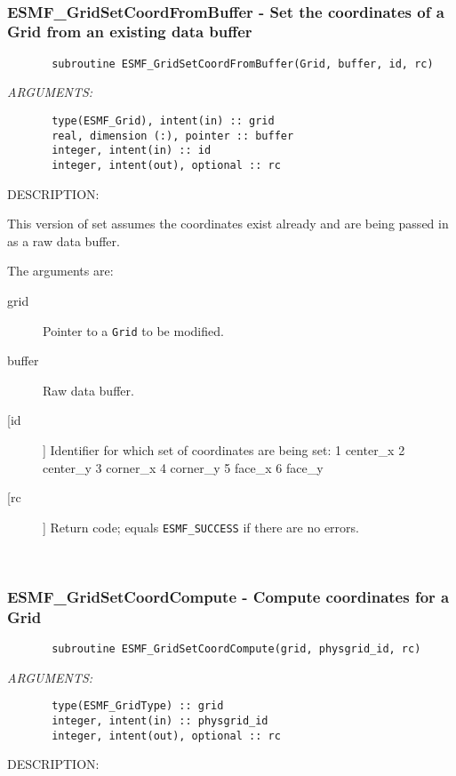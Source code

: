 
\mbox{}\hrulefill\ 
 
\subsubsection{ESMF\_GridSetCoordFromBuffer - Set the coordinates of a Grid from an existing data buffer}


 
\begin{verbatim}       subroutine ESMF_GridSetCoordFromBuffer(Grid, buffer, id, rc)\end{verbatim}{\em ARGUMENTS:}
\begin{verbatim}       type(ESMF_Grid), intent(in) :: grid
       real, dimension (:), pointer :: buffer
       integer, intent(in) :: id
       integer, intent(out), optional :: rc\end{verbatim}
{\sf DESCRIPTION:\\ }


       This version of set assumes the coordinates exist already and are being
       passed in as a raw data buffer.
  
       The arguments are:
       \begin{description}
       \item[grid]
            Pointer to a {\tt Grid} to be modified.
       \item[buffer]
            Raw data buffer.
       \item[[id]]
            Identifier for which set of coordinates are being set:
               1  center\_x
               2  center\_y
               3  corner\_x
               4  corner\_y
               5  face\_x
               6  face\_y 
       \item[[rc]]
            Return code; equals {\tt ESMF\_SUCCESS} if there are no errors.
       \end{description}
   
 
\mbox{}\hrulefill\ 
 
\subsubsection{ESMF\_GridSetCoordCompute - Compute coordinates for a Grid}


 
\begin{verbatim}       subroutine ESMF_GridSetCoordCompute(grid, physgrid_id, rc)\end{verbatim}{\em ARGUMENTS:}
\begin{verbatim}       type(ESMF_GridType) :: grid
       integer, intent(in) :: physgrid_id
       integer, intent(out), optional :: rc\end{verbatim}
{\sf DESCRIPTION:\\ }


